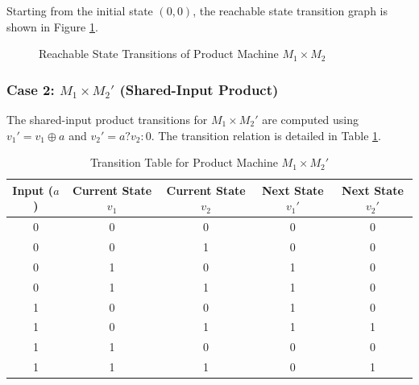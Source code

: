 \documentclass[12pt,a4paper]{article}
\begin{document}
Starting from the initial state $(0,0)$, the reachable state transition graph is shown in Figure \ref{fig:prod_case1}.

\begin{figure}[h!]
    \centering
    \caption{Reachable State Transitions of Product Machine $M_1 \times M_2$}
    \label{fig:prod_case1}
\end{figure}

\subsubsection{Case 2: $M_1 \times M_2'$ (Shared-Input Product)}
The shared-input product transitions for $M_1 \times M_2'$ are computed using $v_1' = v_1 \oplus a$ and $v_2' = a ? v_2 : 0$. The transition relation is detailed in Table \ref{tab:case2_trans}.

\begin{table}[h!]
    \centering
    \caption{Transition Table for Product Machine $M_1 \times M_2'$}
    \label{tab:case2_trans}
    \begin{tabular}{|c|c|c|c|c|}
        \hline
        \textbf{Input ($a$)} & \textbf{Current State $v_1$} & \textbf{Current State $v_2$} & \textbf{Next State $v_1'$} & \textbf{Next State $v_2'$} \\ \hline
        0 & 0 & 0 & 0 & 0 \\ \hline
        0 & 0 & 1 & 0 & 0 \\ \hline
        0 & 1 & 0 & 1 & 0 \\ \hline
        0 & 1 & 1 & 1 & 0 \\ \hline
        1 & 0 & 0 & 1 & 0 \\ \hline
        1 & 0 & 1 & 1 & 1 \\ \hline
        1 & 1 & 0 & 0 & 0 \\ \hline
        1 & 1 & 1 & 0 & 1 \\ \hline
    \end{tabular}
\end{table}
\end{document}
